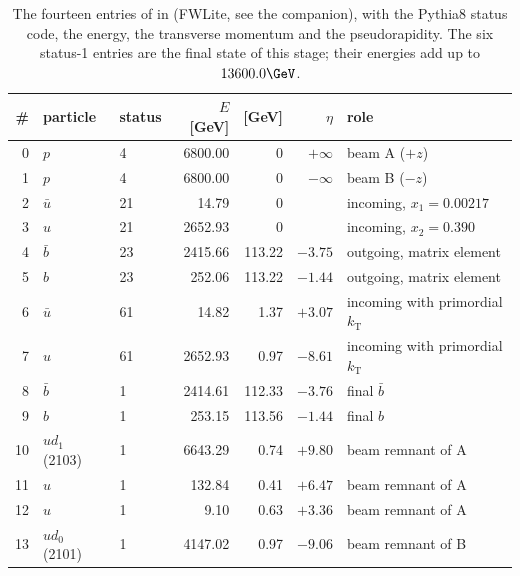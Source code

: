 \begin{table}[htb]
\centering\footnotesize
\caption{The fourteen entries of  in  (FWLite, see the
companion), with the Pythia8 status code, the energy, the transverse momentum and the pseudorapidity.
The six status-1 entries are the final state of this stage; their energies add up to $13600.0\GeV$.}
\label{tab:01_record}
\begin{tabular}{rllrrrl}
\toprule
\# & particle & status & $E$ [GeV] & \pt{} [GeV] & $\eta$ & role \\
\midrule
0 & $p$ & 4 & 6800.00 & 0 & $+\infty$ & beam A ($+z$) \\
1 & $p$ & 4 & 6800.00 & 0 & $-\infty$ & beam B ($-z$) \\
2 & $\bar u$ & 21 & 14.79 & 0 & & incoming, $x_1 = 0.00217$ \\
3 & $u$ & 21 & 2652.93 & 0 & & incoming, $x_2 = 0.390$ \\
4 & $\bar b$ & 23 & 2415.66 & 113.22 & $-3.75$ & outgoing, matrix element \\
5 & $b$ & 23 & 252.06 & 113.22 & $-1.44$ & outgoing, matrix element \\
6 & $\bar u$ & 61 & 14.82 & 1.37 & $+3.07$ & incoming with primordial $k_{\mathrm T}$ \\
7 & $u$ & 61 & 2652.93 & 0.97 & $-8.61$ & incoming with primordial $k_{\mathrm T}$ \\
8 & $\bar b$ & 1 & 2414.61 & 112.33 & $-3.76$ & final $\bar b$ \\
9 & $b$ & 1 & 253.15 & 113.56 & $-1.44$ & final $b$ \\
10 & $ud_1$ (2103) & 1 & 6643.29 & 0.74 & $+9.80$ & beam remnant of A \\
11 & $u$ & 1 & 132.84 & 0.41 & $+6.47$ & beam remnant of A \\
12 & $u$ & 1 & 9.10 & 0.63 & $+3.36$ & beam remnant of A \\
13 & $ud_0$ (2101) & 1 & 4147.02 & 0.97 & $-9.06$ & beam remnant of B \\
\bottomrule
\end{tabular}
\end{table}

